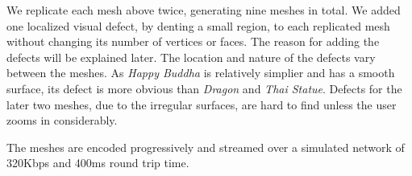 We replicate each mesh above twice, generating nine
meshes in total.  We added one localized
visual defect, by denting a small region, to each replicated mesh 
without changing its number of vertices or faces. The reason for adding the defects will be explained later. 
The location and nature of the
defects vary between the meshes. As \textit{Happy Buddha} is
relatively simplier and has a smooth surface, its defect is
 more obvious than \textit{Dragon}
and \textit{Thai Statue}.  Defects for the later two meshes, due to the
irregular surfaces, are hard to find unless the user zooms in
considerably.

The meshes are encoded progressively and streamed over a simulated network of 320Kbps and 400ms round trip time.  

%
% 
%

